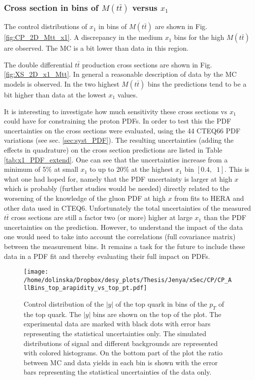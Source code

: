 \subsubsection{Cross section in bins of $M(t\bar{t})$ versus $x_{1}$}

The control distributions of $x_{1}$ in bins of $M(t\bar{t})$ are shown in Fig. \ref{fig:CP_2D_Mtt_x1}. A discrepancy in the medium $x_{1}$ bins for the 
high $M(t\bar{t})$ are observed. The MC is a bit lower than data in this region.

The double differential $t\bar{t}$ production cross sections are shown in Fig. \ref{fig:XS_2D_x1_Mtt}. In general a reasonable description of data by the MC
models is observed. In the two highest $M(t\bar{t})$ bins the predictions tend to be a bit higher than data at the lowest $x_{1}$ values.

It is interesting to investigate how much sensitivity these cross sections
vs $x_{1}$ could have for constraining the proton PDFs.
In order to test this the PDF uncertainties on the \MG cross sections
were evaluated, using the 44 CTEQ66 PDF variations (see sec. \ref{sec:syst_PDF}).
The resulting uncertainties (adding the effects in quadrature) on the
cross section predictions are listed in Table \ref{tab:x1_PDF_extend}. One
can see that the uncertainties increase from a minimum of 5\% at small
$x_{1}$ to up to 20\% at the highest $x_{1}$ bin $[0.4,\;\;1]$. This is what one had hoped
for, namely that the PDF uncertainty is larger at high $x$ which is
probably (further studies would be needed) directly related to the
worsening of the knowledge of the gluon PDF at high $x$ from fits to HERA
and other data used in CTEQ6.
Unfortunately the total uncertainties of the measured $t\bar{t}$ cross sections
are still a factor two
(or more)  higher at large $x_{1}$ than the PDF uncertainties on the prediction.
However, to understand the impact of the data one would need to take
into account the correlations (full covariance matrix) between the
measurement bins. It remains a task for the future to  include these data
in a PDF fit and thereby evaluating their full impact on PDFs.





\begin{figure}[H]
  \centering
  \texttt{[image: /home/dolinska/Dropbox/desy\_plots/Thesis/Jenya/xSec/CP/CP\_AllBins\_top\_arapidity\_vs\_top\_pt.pdf]}
  \caption{Control distribution of the $|y|$ of the top quark in bins of the $p_{T}$ of the top quark. The $|y|$ bins are shown on the top 
  of the plot. The experimental data are marked with black dots with error bars representing the statistical uncertainties only. The simulated 
  distributions of signal and different backgrounds are represented with colored histograms. On the bottom part of the plot the ratio between 
  MC and data yields in each bin is shown with the error bars representing the statistical uncertainties of the data only.}
  \label{fig:CP_2D_y_pt}
\end{figure}

